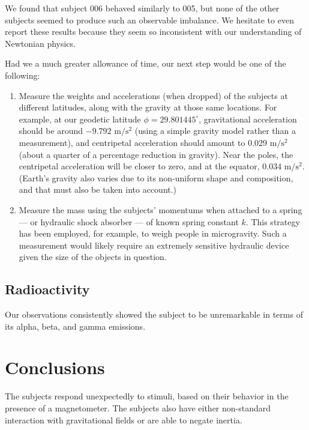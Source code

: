 \documentclass[10pt]{article}
\theoremstyle{definition}
\begin{document}
We found that subject 006 behaved similarly to 005, but none of the other subjects seemed to produce such an observable imbalance.
We hesitate to even report these results because they seem so inconsistent with our understanding of Newtonian physics.

Had we a much greater allowance of time, our next step would be one of the following:
\begin{enumerate}
\item Measure the weights and accelerations (when dropped) of the subjects at different latitudes, along with the gravity at those same locations. For example, at our geodetic latitude $\phi=29.801445^\circ$, gravitational acceleration should be around $-9.792\textrm{ m}/\textrm{s}^2$ (using a simple gravity model rather than a measurement), and centripetal acceleration should amount to 0.029 $\textrm{m}/\textrm{s}^2$ (about a quarter of a percentage reduction in gravity). Near the poles, the centripetal acceleration will be closer to zero, and at the equator, 0.034 $\textrm{m}/\textrm{s}^2$. (Earth's gravity also varies due to its non-uniform shape and composition, and that must also be taken into account.)
\item Measure the mass using the subjects' momentums when attached to a spring --- or hydraulic shock absorber --- of known spring constant $k$. This strategy has been employed, for example, to weigh people in microgravity. Such a measurement would likely require an extremely sensitive hydraulic device given the size of the objects in question.
\end{enumerate}

\subsection{Radioactivity}
Our observations consistently showed the subject to be unremarkable in terms of its alpha, beta, and gamma emissions.

\section{Conclusions}\label{conclusions}
The subjects respond unexpectedly to stimuli, based on their behavior in the presence of a magnetometer. The subjects also have either non-standard interaction with gravitational fields or are able to negate inertia.
\end{document}
